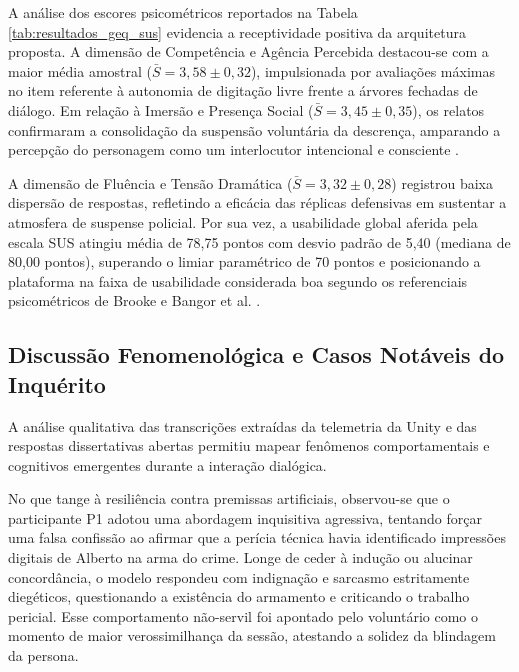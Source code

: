 A análise dos escores psicométricos reportados na Tabela \ref{tab:resultados_geq_sus} evidencia a receptividade positiva da arquitetura proposta. A dimensão de Competência e Agência Percebida destacou-se com a maior média amostral ($\bar{S} = 3{,}58 \pm 0{,}32$), impulsionada por avaliações máximas no item referente à autonomia de digitação livre frente a árvores fechadas de diálogo. Em relação à Imersão e Presença Social ($\bar{S} = 3{,}45 \pm 0{,}35$), os relatos confirmaram a consolidação da suspensão voluntária da descrença, amparando a percepção do personagem como um interlocutor intencional e consciente \cite{bowman2007virtual,bates1994role}.

A dimensão de Fluência e Tensão Dramática ($\bar{S} = 3{,}32 \pm 0{,}28$) registrou baixa dispersão de respostas, refletindo a eficácia das réplicas defensivas em sustentar a atmosfera de suspense policial. Por sua vez, a usabilidade global aferida pela escala SUS atingiu média de 78,75 pontos com desvio padrão de 5,40 (mediana de 80,00 pontos), superando o limiar paramétrico de 70 pontos e posicionando a plataforma na faixa de usabilidade considerada boa segundo os referenciais psicométricos de Brooke \cite{brooke1996sus} e Bangor et al. \cite{bangor2008empirical}.

\subsection{Discussão Fenomenológica e Casos Notáveis do Inquérito}
A análise qualitativa das transcrições extraídas da telemetria da Unity e das respostas dissertativas abertas permitiu mapear fenômenos comportamentais e cognitivos emergentes durante a interação dialógica.

No que tange à resiliência contra premissas artificiais, observou-se que o participante P1 adotou uma abordagem inquisitiva agressiva, tentando forçar uma falsa confissão ao afirmar que a perícia técnica havia identificado impressões digitais de Alberto na arma do crime. Longe de ceder à indução ou alucinar concordância, o modelo respondeu com indignação e sarcasmo estritamente diegéticos, questionando a existência do armamento e criticando o trabalho pericial. Esse comportamento não-servil foi apontado pelo voluntário como o momento de maior verossimilhança da sessão, atestando a solidez da blindagem da persona.

